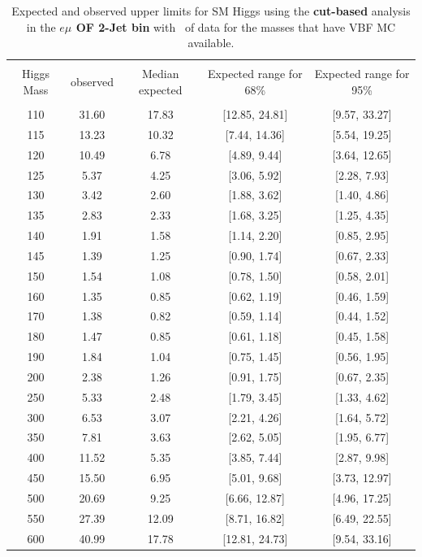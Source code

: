 \begin{table}[hbp!]
\begin{center}
\begin{tabular}{c c c c c}
\hline
\vspace{-3mm} && \\
 Higgs Mass & observed  & Median expected & Expected range for 68\% & Expected range for 95\%   \\
\vspace{-3mm} && \\
\hline
110 & 31.60 & 17.83 & [12.85, 24.81] & [9.57, 33.27] \\
115 & 13.23 & 10.32 & [7.44, 14.36] & [5.54, 19.25] \\
120 & 10.49 & 6.78 & [4.89, 9.44] & [3.64, 12.65] \\
125 & 5.37 & 4.25 & [3.06, 5.92] & [2.28, 7.93] \\
130 & 3.42 & 2.60 & [1.88, 3.62] & [1.40, 4.86] \\
135 & 2.83 & 2.33 & [1.68, 3.25] & [1.25, 4.35] \\
140 & 1.91 & 1.58 & [1.14, 2.20] & [0.85, 2.95] \\
145 & 1.39 & 1.25 & [0.90, 1.74] & [0.67, 2.33] \\
150 & 1.54 & 1.08 & [0.78, 1.50] & [0.58, 2.01] \\
160 & 1.35 & 0.85 & [0.62, 1.19] & [0.46, 1.59] \\
170 & 1.38 & 0.82 & [0.59, 1.14] & [0.44, 1.52] \\
180 & 1.47 & 0.85 & [0.61, 1.18] & [0.45, 1.58] \\
190 & 1.84 & 1.04 & [0.75, 1.45] & [0.56, 1.95] \\
200 & 2.38 & 1.26 & [0.91, 1.75] & [0.67, 2.35] \\
250 & 5.33 & 2.48 & [1.79, 3.45] & [1.33, 4.62] \\
300 & 6.53 & 3.07 & [2.21, 4.26] & [1.64, 5.72] \\
350 & 7.81 & 3.63 & [2.62, 5.05] & [1.95, 6.77] \\
400 & 11.52 & 5.35 & [3.85, 7.44] & [2.87, 9.98] \\
450 & 15.50 & 6.95 & [5.01, 9.68] & [3.73, 12.97] \\
500 & 20.69 & 9.25 & [6.66, 12.87] & [4.96, 17.25] \\
550 & 27.39 & 12.09 & [8.71, 16.82] & [6.49, 22.55] \\
600 & 40.99 & 17.78 & [12.81, 24.73] & [9.54, 33.16] \\
\hline
\end{tabular}
\caption{Expected and observed upper limits for SM Higgs using the
  {\bf cut-based} analysis in the {\bf $e\mu$ OF 2-Jet bin} with \intlumiEightTeV\ of data
 for the masses that have VBF MC available. }
\label{tab:cutbase_uls_2j}
\end{center}
\end{table}
